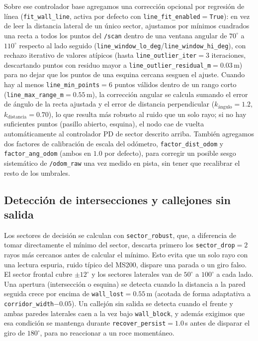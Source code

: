 \documentclass[conference]{IEEEtran}
\begin{document}
Sobre ese controlador base agregamos una corrección opcional por regresión de línea (\texttt{fit\_wall\_line}, activa por defecto con \texttt{line\_fit\_enabled}$=$\texttt{True}): en vez de leer la distancia lateral de un único sector, ajustamos por mínimos cuadrados una recta a todos los puntos del \texttt{/scan} dentro de una ventana angular de $70^\circ$ a $110^\circ$ respecto al lado seguido (\texttt{line\_window\_lo\_deg}/\texttt{line\_window\_hi\_deg}), con rechazo iterativo de valores atípicos (hasta \texttt{line\_outlier\_iter}$=3$ iteraciones, descartando puntos con residuo mayor a \texttt{line\_outlier\_residual\_m}$=0.03$\,m) para no dejar que los puntos de una esquina cercana sesguen el ajuste. Cuando hay al menos \texttt{line\_min\_points}$=6$ puntos válidos dentro de un rango corto (\texttt{line\_max\_range\_m}$=0.55$\,m), la corrección angular se calcula sumando el error de ángulo de la recta ajustada y el error de distancia perpendicular ($k_{\text{ángulo}}=1.2$, $k_{\text{distancia}}=0.70$), lo que resulta más robusto al ruido que un solo rayo; si no hay suficientes puntos (pasillo abierto, esquina), el nodo cae de vuelta automáticamente al controlador PD de sector descrito arriba. También agregamos dos factores de calibración de escala del odómetro, \texttt{factor\_dist\_odom} y \texttt{factor\_ang\_odom} (ambos en $1.0$ por defecto), para corregir un posible sesgo sistemático de \texttt{/odom\_raw} una vez medido en pista, sin tener que recalibrar el resto de los umbrales.

\subsection{Detección de intersecciones y callejones sin salida}
Los sectores de decisión se calculan con \texttt{sector\_robust}, que, a diferencia de tomar directamente el mínimo del sector, descarta primero los \texttt{sector\_drop}$=2$ rayos más cercanos antes de calcular el mínimo. Esto evita que un solo rayo con una lectura espuria, ruido típico del MS200, dispare una parada o un giro falso. El sector frontal cubre $\pm12^\circ$ y los sectores laterales van de $50^\circ$ a $100^\circ$ a cada lado. Una apertura (intersección o esquina) se detecta cuando la distancia a la pared seguida crece por encima de \texttt{wall\_lost}$=0.55$\,m (acotada de forma adaptativa a \texttt{corridor\_width}$-0.05$). Un callejón sin salida se detecta cuando el frente y ambas paredes laterales caen a la vez bajo \texttt{wall\_block}, y además exigimos que esa condición se mantenga durante \texttt{recover\_persist}$=1.0$\,s antes de disparar el giro de $180^\circ$, para no reaccionar a un roce momentáneo.
\end{document}
